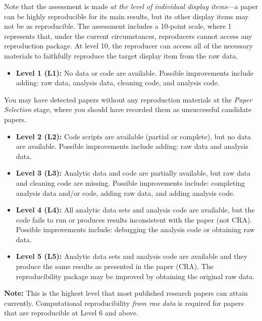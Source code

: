 \documentclass[
]{book}
\providecommand{\tightlist}{%
  \setlength{\itemsep}{0pt}\setlength{\parskip}{0pt}}
\begin{document}
Note that the assessment is made \emph{at the level of individual display items}---a paper can be highly reproducible for its main results, but its other display items may not be as reproducible. The assessment includes a 10-point scale, where 1 represents that, under the current circumstances, reproducers cannot access any reproduction package. At level 10, the reproducer can access all of the necessary materials to faithfully reproduce the target display item from the raw data.

\begin{itemize}
\tightlist
\item
  \textbf{Level 1 (L1):} No data or code are available. Possible improvements include adding: raw data, analysis data, cleaning code, and analysis code.
\end{itemize}

You may have detected papers without any reproduction materials at the \emph{Paper Selection} stage, where you should have recorded them as unsuccessful candidate papers.

\begin{itemize}
\item
  \textbf{Level 2 (L2):} Code scripts are available (partial or complete), but no data are available. Possible improvements include adding: raw data and analysis data.
\item
  \textbf{Level 3 (L3):} Analytic data and code are partially available, but raw data and cleaning code are missing. Possible improvements include: completing analysis data and/or code, adding raw data, and adding analysis code.
\item
  \textbf{Level 4 (L4):} All analytic data sets and analysis code are available, but the code fails to run or produces results inconsistent with the paper (not CRA). Possible improvements include: debugging the analysis code or obtaining raw data.
\item
  \textbf{Level 5 (L5):} Analytic data sets and analysis code are available and they produce the same results as presented in the paper (CRA). The reproducibility package may be improved by obtaining the original raw data.
\end{itemize}

\textbf{Note:} This is the highest level that most published research papers can attain currently. Computational reproducibility \emph{from raw data} is required for papers that are reproducible at Level 6 and above.
\end{document}
